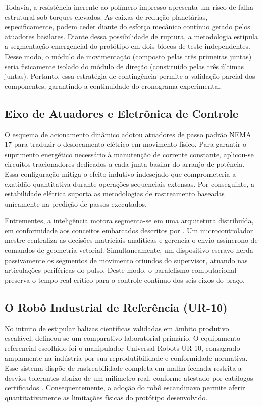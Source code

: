 Todavia, a resistência inerente ao polímero impresso apresenta um risco de falha estrutural sob torques elevados. As caixas de redução planetárias, especificamente, podem ceder diante do esforço mecânico contínuo gerado pelos atuadores basilares. Diante dessa possibilidade de ruptura, a metodologia estipula a segmentação emergencial do protótipo em dois blocos de teste independentes. Desse modo, o módulo de movimentação (composto pelas três primeiras juntas) seria fisicamente isolado do módulo de direção (constituído pelas três últimas juntas). Portanto, essa estratégia de contingência permite a validação parcial dos componentes, garantindo a continuidade do cronograma experimental.

\subsection{Eixo de Atuadores e Eletrônica de Controle}

O esquema de acionamento dinâmico adotou atuadores de passo padrão NEMA 17 para traduzir o deslocamento elétrico em movimento físico. Para garantir o suprimento energético necessário à manutenção de corrente constante, aplicou-se circuitos tracionadores dedicados a cada junta basilar do arranjo de potência. Essa configuração mitiga o efeito indutivo indesejado que comprometeria a exatidão quantitativa durante operações sequenciais extensas. Por conseguinte, a estabilidade elétrica suporta as metodologias de rastreamento baseadas unicamente na predição de passos executados.

Entrementes, a inteligência motora segmenta-se em uma arquitetura distribuída, em conformidade aos conceitos embarcados descritos por . Um microcontrolador mestre centraliza as decisões matriciais analíticas e gerencia o envio assíncrono de comandos de geometria vetorial. Simultaneamente, um dispositivo escravo herda passivamente os segmentos de movimento oriundos do supervisor, atuando nas articulações periféricas do pulso. Deste modo, o paralelismo computacional preserva o tempo real crítico para o controle contínuo dos seis eixos do braço.

\subsection{O Robô Industrial de Referência (UR-10)}

No intuito de estipular balizas científicas validadas em âmbito produtivo escalável, delineou-se um comparativo laboratorial primário. O equipamento referencial escolhido foi o manipulador Universal Robots UR-10, consagrado amplamente na indústria por sua reprodutibilidade e conformidade normativa. Esse sistema dispõe de rastreabilidade completa em malha fechada restrita a desvios tolerantes abaixo de um milímetro real, conforme atestado por catálogos certificados \cite{universalrobots2023}. Consequentemente, a adoção do robô escandinavo permite aferir quantitativamente as limitações físicas do protótipo desenvolvido.

